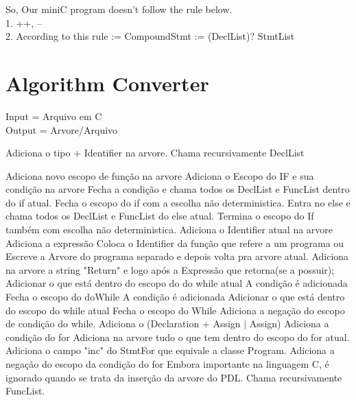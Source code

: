 \documentclass{article}
\begin{document}
So, Our miniC program doesn't follow the rule below.  \\
    1. ++, --  \\
    2. According to this rule  :=  CompoundStmt := { (DeclList)? StmtList }  \\

\section{Algorithm Converter} 
Input = Arquivo em C \\
Output = Arvore/Arquivo
\vspace{10mm}
\begin{algorithm}
\begin{algorithmic}
		\STATE Adiciona o tipo + Identifier na arvore. 
	\ENDIF
		\STATE Chama recursivamente DeclList
	\ENDIF
\ENDIF
\end{algorithmic}
\end{algorithm}

\vspace{-10mm}
\begin{algorithm}

\begin{algorithmic}
		\STATE Adiciona novo escopo de função na arvore
				\STATE Adiciona o Escopo do IF e sua condição na arvore
				\STATE Fecha a condição e chama todos os DeclList e FuncList dentro do if atual.
					\STATE Fecha o escopo do if com a escolha não deterministica.
					\STATE Entra no else e chama todos os DeclList e FuncList do else atual.
				\ELSE
					\STATE Termina o escopo do If também com escolha não deterministica.
				\ENDIF
			\ENDIF
				\STATE Adiciona o Identifier atual na arvore
				\STATE Adiciona a expressão
			\ENDIF
				\STATE Coloca o Identifier da função que refere a um programa ou Escreve a Arvore do programa separado e depois volta pra arvore atual.					
			\ENDIF
				\STATE Adiciona na arvore a string "Return" e logo após a Expressão que retorna(se a possuir);
			\ENDIF
					\STATE Adicionar o que está dentro do escopo do do while atual
					\STATE A condição é adicionada
					\STATE Fecha o escopo do doWhile
				\ELSE
					\STATE A condição é adicionada
					\STATE Adicionar o que está dentro do escopo do while atual
					\STATE Fecha o escopo do While
				\ENDIF
				\STATE Adiciona a negação do escopo de condição do while.
			\ENDIF
				\STATE Adiciona o (Declaration + Assign $|$ Assign)
				\STATE Adiciona a condição do for
				\STATE Adiciona na arvore tudo o que tem dentro do escopo do for atual.
				\STATE Adiciona o campo "inc" do StmtFor que equivale a classe Program.
				\STATE Adiciona a negação do escopo da condição do for
			\ENDIF
				\STATE Embora importante na linguagem C, é ignorado quando se trata da inserção da arvore do PDL.
			\ENDIF
		\ENDIF
	\ENDIF
			\STATE Chama recursivamente FuncList.
	\ENDIF
\ENDIF
\end{algorithmic}
\end{algorithm}
\vspace{-50mm}
\end{document}
